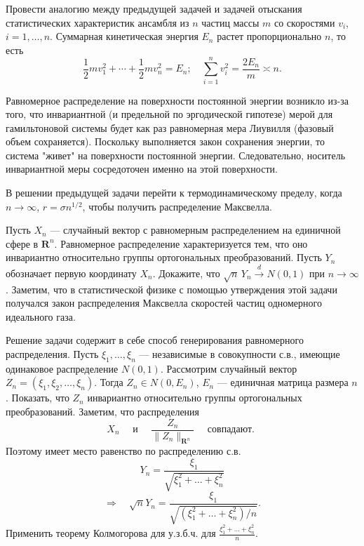 \begin{problem}
Провести аналогию между предыдущей задачей и задачей отыскания статистических характеристик ансамбля из $n$ частиц массы $m$  со скоростями $v_i$, $i=1,\dots,n$. Суммарная кинетическая энергия $E_n$ растет пропорционально $n$, то есть 
\begin{equation*}
\frac{1}{2}mv_1^2+\cdots+\frac{1}{2}m v_n^2 = E_n;\quad \sum_{i=1}^n v^2_i=\frac{2E_n}{m}\asymp n.
\end{equation*}
\end{problem}
\begin{remark}
Равномерное распределение на поверхности постоянной энергии возникло из-за того, что инвариантной (и предельной по эргодической гипотезе) мерой для гамильтоновой системы будет как раз равномерная мера Лиувилля (фазовый объем сохраняется). Поскольку выполняется закон сохранения энергии, то система "живет"   на поверхности постоянной энергии. Следовательно, носитель инвариантной меры сосредоточен именно на этой поверхности. 

В решении предыдущей задачи перейти к термодинамическому пределу, когда $n\to\infty$, $r = \sigma n^{1/2}$, чтобы получить распределение Максвелла. 
\end{remark}

\begin{problem}
Пусть $X_n$ --- случайный вектор с равномерным распределением на единичной сфере в ${\mathbf R}^n$. Равномерное распределение 
характеризуется тем, что оно инвариантно относительно группы ортогональных преобразований. Пусть $Y_n$ обозначает первую координату $X_n$. 
Докажите, что $\sqrt{n}\, Y_n \xrightarrow{d}N(0,1)$ при $n\to\infty$. Заметим, что в статистической физике с помощью утверждения 
этой задачи получался закон распределения Максвелла скоростей частиц одномерного идеального газа. 
\end{problem}

\begin{remark}
Решение задачи содержит в себе способ генерирования равномерного распределения. 
Пусть $\xi_1,\ldots, \xi_n$ --- независимые в совокупности с.в., имеющие одинаковое распределение $N(0,1)$. Рассмотрим случайный вектор 
$Z_n=(\xi_1,\xi_2,\ldots,\xi_n)$. Тогда $Z_n\in N(0,E_n)$, $E_n$ --- единичная матрица размера $n$. Показать, что $Z_n$ инвариантно относительно группы ортогональных преобразований. Заметим, что распределения 
$$
X_n \quad\text{ и } \quad \frac{Z_n}{\|Z_n \|_{{\mathbf R}^n}} \quad \text{ совпадают. }
$$
Поэтому имеет место равенство по распределению с.в. 
$$
Y_n=\frac{\xi_1}{\sqrt{\xi_1^2+\ldots+ \xi_n^2}} 
$$
$$
\Rightarrow \quad \sqrt{n}Y_n = \frac{\xi_1}{\sqrt{(\xi_1^2+\ldots+ \xi_n^2)/n}} . 
$$
Применить теорему Колмогорова для у.з.б.ч. для $\frac{\xi_1^2+\ldots+ \xi_n^2}{n}$. 

\end{remark}

